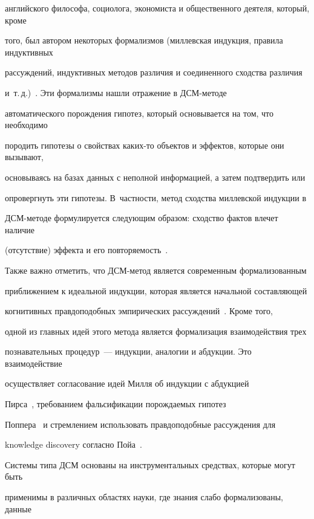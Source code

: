 английского философа, социолога, экономиста и общественного деятеля, который, кроме 


того, был автором некоторых формализмов (миллевская индукция, правила индуктивных 


рассуждений, индуктивных методов различия и соединенного сходства различия 


и~т.\,д.)~\cite{43-2-11}. Эти формализмы нашли отражение в ДСМ-ме\-то\-де 


автоматического порождения гипотез, который основывается на том, что необходимо 


породить гипотезы о свойствах каких-то объектов и эффектов, которые они вызывают, 


основываясь на базах данных с неполной информацией, а затем подтвердить или 


опровергнуть эти гипотезы. В~частности, метод сходства миллевской индукции в 


   ДСМ-методе формулируется следующим образом: сходство фактов влечет наличие 


(отсутствие) эффекта и его повторяемость~\cite{43-2-11}.


   


   Также важно отметить, что ДСМ-метод является современным формализованным 


приближением к идеальной индукции, которая является начальной составляющей 


когнитивных правдоподобных эмпирических рассуждений~\cite{44-2-11}. Кроме того, 


одной из главных идей этого метода является формализация взаимодействия трех 


познавательных процедур~--- индукции, аналогии и абдукции. Это взаимодействие 


осуществляет согласование идей Милля об индукции с абдукцией 


   Пирса~\cite{45-2-11}, требованием фальсификации порождаемых гипотез 


Поппера~\cite{46-2-11} и стремлением использовать правдоподобные рассуждения для 


knowledge discovery согласно Пойа~\cite{47-2-11}.


   


   Системы типа ДСМ основаны на инструментальных средствах, которые могут быть 


применимы в различных областях науки, где знания слабо формализованы, данные 


